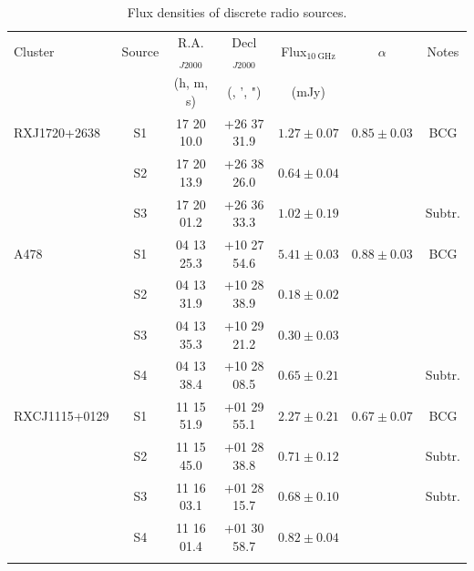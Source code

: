 \begin{table}
    \centering
    \begingroup
        \footnotesize
        \setlength{\tabcolsep}{6pt}
        \renewcommand{\arraystretch}{0.9}

        \begin{threeparttable}
            \caption{Flux densities of discrete radio sources.}
            \label{tab:source_flux_densities}
            \begin{tabular}{lcccccc}
                \toprule
                Cluster         & Source        & R.A.$_{J2000}$    & Decl$_{J2000}$        & Flux$_{10 \>\text{GHz}}$     & $\alpha$      & Notes     \\ 
                                &               & (h, m, s)         & (\textdegree{}, ', ") & (mJy)                      &               &           \\ 
                \midrule
                RXJ1720+2638    & S1            & 17 20 10.0        & +26 37 31.9           & $1.27\pm0.07$              & $0.85\pm0.03$ & BCG       \\
                                & S2            & 17 20 13.9        & +26 38 26.0           & $0.64\pm0.04$              &               &           \\
                                & S3            & 17 20 01.2        & +26 36 33.3           & $1.02\pm0.19$              &               & Subtr.    \\
                \addlinespace[0.5em]

                A478            & S1            & 04 13 25.3        & +10 27 54.6           & $5.41\pm0.03$              & $0.88\pm0.03$ & BCG\\
                                & S2            & 04 13 31.9        & +10 28 38.9           & $0.18\pm0.02$              &               &           \\
                                & S3            & 04 13 35.3        & +10 29 21.2           & $0.30\pm0.03$              &               &           \\
                                & S4            & 04 13 38.4        & +10 28 08.5           & $0.65\pm0.21$              &               & Subtr.    \\
                \addlinespace[0.5em]
                
                RXCJ1115+0129   & S1            & 11 15 51.9        & +01 29 55.1           & $2.27\pm0.21$              & $0.67\pm0.07$ & BCG \\
                                & S2            & 11 15 45.0        & +01 28 38.8           & $0.71\pm0.12$              &  & Subtr. \\
                                & S3            & 11 16 03.1        & +01 28 15.7           & $0.68\pm0.10$              &  & Subtr. \\
                                & S4            & 11 16 01.4        & +01 30 58.7           & $0.82\pm0.04$              &  & \\
                \addlinespace[0.5em]
                

\end{tabular}
\end{threeparttable}
\end{table}

